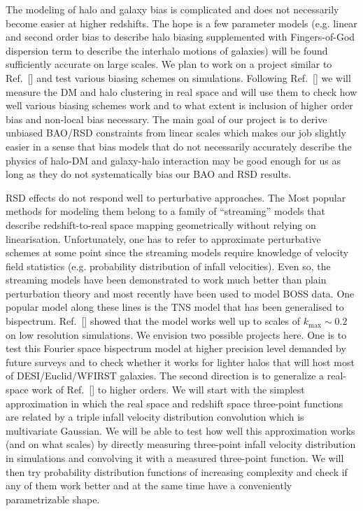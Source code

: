 The modeling of halo and galaxy bias is complicated and does not necessarily
become easier at higher redshifts. The hope is a few parameter models (e.g.
linear and second order bias to describe halo biasing supplemented with
Fingers-of-God dispersion term to describe the interhalo motions of galaxies)
will be found sufficiently accurate on large scales. We plan to work on a
project similar to Ref.~[] and test various biasing schemes on simulations.
Following Ref.~[] we will measure the DM and halo clustering in real space and
will use them to check how well various biasing schemes work and to what extent
is inclusion of higher order bias and non-local bias necessary. The main goal
of our project is to derive unbiased BAO/RSD constraints from linear scales
which makes our job slightly easier in a sense that bias models that do not
necessarily accurately describe the physics of halo-DM and galaxy-halo
interaction may be good enough for us as long as they do not systematically
bias our BAO and RSD results.

RSD effects do not respond well to perturbative approaches. The Most popular
methods for modeling them belong to a family of ``streaming'' models that
describe redshift-to-real space mapping geometrically without relying on
linearisation. Unfortunately, one has to refer to approximate perturbative
schemes at some point since the streaming models require knowledge of velocity
field statistics (e.g. probability distribution of infall velocities). Even so,
the streaming models have been demonstrated to work much better than plain
perturbation theory and most recently have been used to model BOSS data. One
popular model along these lines is the TNS model that has been generalised to
bispectrum. Ref.~[] showed that the model works well up to scales of
$k_\mathrm{max} \sim 0.2$ on low resolution simulations. We envision two
possible projects here. One is to test this Fourier space bispectrum model at
higher precision level demanded by future surveys and to check whether it works
for lighter halos that will host most of DESI/Euclid/WFIRST galaxies. The
second direction is to generalize a real-space work of Ref.~[] to higher
orders. We will start with the simplest approximation in which the real space
and redshift space three-point functions are related by a triple infall
velocity distribution convolution which is multivariate Gaussian. We will be
able to test how well this approximation works (and on what scales) by directly
measuring three-point infall velocity distribution in simulations and
convolving it with a measured three-point function. We will then try
probability distribution functions of increasing complexity and check if any of
them work better and at the same time have a conveniently parametrizable shape.

